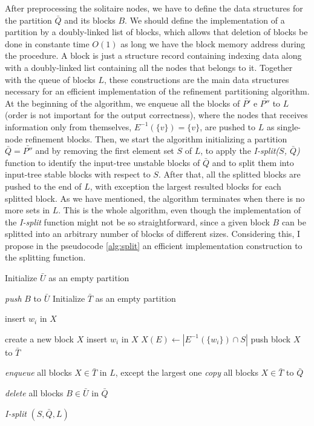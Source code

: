 \documentclass[12pt]{diazessay} %
\begin{document}
After preprocessing the solitaire nodes, we have to define the data structures for the partition $\bar{Q}$ and its blocks $B$. We should define the implementation of a partition by a doubly-linked list of blocks, which allows that deletion of blocks be done in constante time $O(1)$ as long we have the block memory address during the procedure. A block is just a structure record containing indexing data along with a doubly-linked list containing all the nodes that belongs to it. Together with the queue of blocks $L$, these constructions are the main data structures necessary for an efficient implementation of the refinement partitioning algorithm. At the beginning of the algorithm, we enqueue all the blocks of $\bar{P'}$ e $\bar{P''}$ to $L$ (order is not important for the output correctness), where the nodes that receives information only from themselves, $E^{-1}(\{v\}) = \{v\}$, are pushed to $L$ as single-node refinement blocks. Then, we start the algorithm initializing a partition $\bar{Q} = \bar{P''}$ and by removing the first element set $S$ of $L$, to apply the \textit{I-split($S$, $\bar{Q}$)} function to identify the input-tree unstable blocks of $\bar{Q}$ and to split them into input-tree stable blocks with respect to $S$. After that, all the splitted blocks are pushed to the end of $L$, with exception the largest resulted blocks for each splitted block. As we have mentioned, the algorithm terminates when there is no more sets in $L$. This is the whole algorithm, even though the implementation of the \textit{I-split} function might not be so straightforward, since a given block $B$ can be splitted into an arbitrary number of blocks of different sizes. Considering this, I propose in the pseudocode \ref{alg:split} an efficient implementation construction to the splitting function.

\begin{algorithm}[t]
	\SetAlgoLined
	Initialize $\bar{U}$ as an empty partition\;
	{
		{
			\textit{push} $B$ to $\bar{U}$\;
			Initialize $\bar{T}$ as an empty partition\;
			{
				{
					insert $w_i$ in $X$\;
					
				}
				{
					create a new block $X$\;
					insert $w_i$ in $X$\;
					$X(E) \leftarrow | E^{-1}(\{w_i\})\cap S |$\;
					push block $X$ to $\bar{T}$ 
				}
			}
		}
		\textit{enqueue} all blocks $X \in \bar{T}$ in $L$, except the largest one\;
		\textit{copy} all blocks $X \in \bar{T}$ to $\bar{Q}$\;
	}
	\textit{delete} all blocks $B \in \bar{U}$ in $\bar{Q}$
	\caption{\textit{I-split} $(S,\bar{Q}, L)$}
	\label{alg:split}
\end{algorithm}
\end{document}
